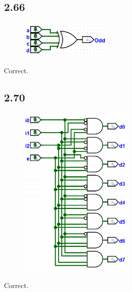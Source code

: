 \documentclass{article}
\begin{document}
\subsection*{2.66}
\begin{figure}[H]
    \centering
    \includegraphics[width=0.4\textwidth]{./images/2_66.png}
\end{figure}
\textcolor{mygreen}{Correct.}

\subsection*{2.70}
\begin{figure}[H]
    \centering
    \includegraphics[width=0.5\textwidth]{./images/2_70.png}
\end{figure}
\textcolor{mygreen}{Correct.}
\end{document}
